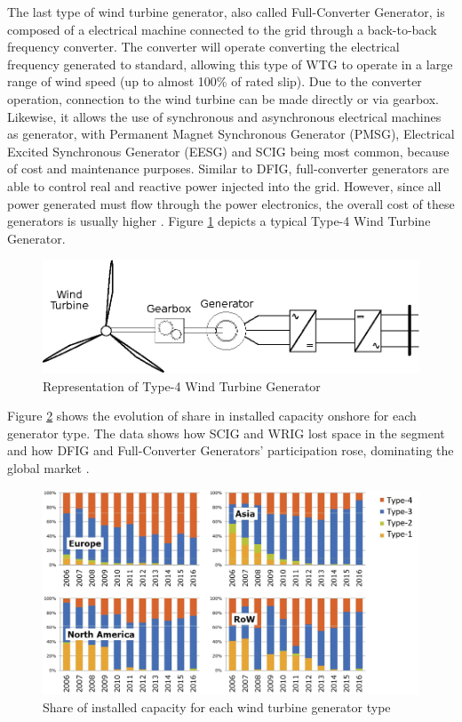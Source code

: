 The last type of wind turbine generator, also called Full-Converter Generator, is composed of a electrical machine connected to the grid through a back-to-back frequency converter. The converter will operate converting the electrical frequency generated to standard, allowing this type of WTG to operate in a large range of wind speed (up to almost 100\% of rated slip). Due to the converter operation, connection to the wind turbine can be made directly or via gearbox. Likewise, it allows the use of synchronous and asynchronous electrical machines as generator, with Permanent Magnet Synchronous Generator (PMSG), Electrical Excited Synchronous Generator (EESG) and SCIG being most common, because of cost and maintenance purposes. Similar to DFIG, full-converter generators are able to control real and reactive power injected into the grid. However, since all power generated must flow through the power electronics, the overall cost of these generators is usually higher \cite{Yaramasu2015}. Figure \ref{fig: WTG4} depicts a typical Type-4 Wind Turbine Generator.

\begin{figure}[h]
	\caption{Representation of Type-4 Wind Turbine Generator}
	\begin{center}
		\includegraphics[scale=1]{Images/Type4WTG.eps}
	\end{center}
	\label{fig: WTG4}
\end{figure}

Figure \ref{fig: WindShare} shows the evolution of share in installed capacity onshore for each generator type. The data shows how SCIG and WRIG lost space in the segment and how DFIG and Full-Converter Generators' participation rose, dominating the global market \cite{Magagna2017}.

\begin{figure}[h]
	\caption{Share of installed capacity for each wind turbine generator type}
	\begin{center}
		\includegraphics[scale=.2]{Images/WTGTypes.jpg}
	\end{center}
	\label{fig: WindShare}
\end{figure}

